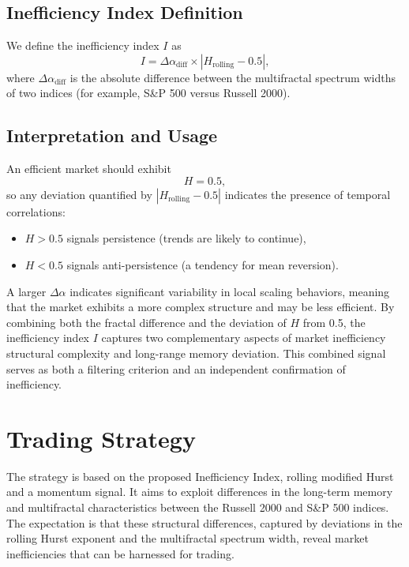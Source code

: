\documentclass[11pt]{extarticle}
\begin{document}
\subsection*{Inefficiency Index Definition}

We define the inefficiency index $I$ as
\begin{equation}
I = \Delta\alpha_{\text{diff}} \times \left|H_{\text{rolling}} - 0.5\right|,
\end{equation}
where $\Delta\alpha_{\text{diff}}$ is the absolute difference between the multifractal spectrum widths of two indices (for example, S\&P 500 versus Russell 2000).

\subsection*{Interpretation and Usage}

An efficient market should exhibit
\begin{equation}
H = 0.5,
\end{equation}
so any deviation quantified by $\left|H_{\text{rolling}} - 0.5\right|$ indicates the presence of temporal correlations:
\begin{itemize}
    \item $H>0.5$ signals persistence (trends are likely to continue),
    \item $H<0.5$ signals anti-persistence (a tendency for mean reversion).
\end{itemize}

A larger $\Delta \alpha$ indicates significant variability in local scaling behaviors,
meaning that the market exhibits a more complex structure and may be less efficient. By
combining both the fractal difference and the deviation of $H$ from 0.5, the inefficiency index $I$
captures two complementary aspects of market inefficiency structural complexity and long-range memory deviation.
This combined signal serves as both a filtering criterion and an independent confirmation of inefficiency.



\section{Trading Strategy}

The strategy is based on the proposed Inefficiency Index, rolling modified Hurst and a momentum signal. It aims to exploit differences in the
long-term memory and multifractal characteristics between the Russell 2000 and S\&P 500 indices. The expectation is that
these structural differences, captured by deviations in the rolling Hurst exponent and the multifractal spectrum width,
reveal market inefficiencies that can be harnessed for trading.
\end{document}
